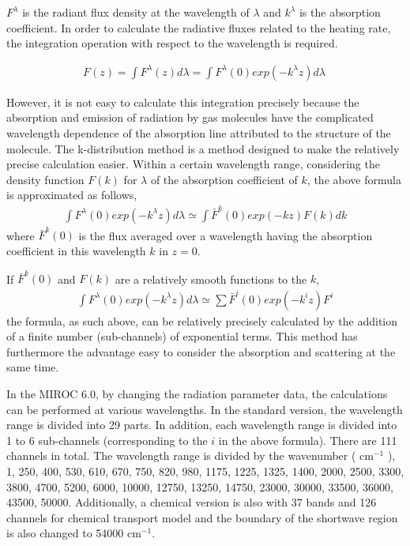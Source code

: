 \(F^{\lambda}\) is the radiant flux density at the wavelength of
\(\lambda\) and \(k^{\lambda}\) is the absorption coefficient. In order
to calculate the radiative fluxes related to the heating rate, the
integration operation with respect to the wavelength is required.

\begin{eqnarray}
  F(z) = \int F^\lambda(z) d \lambda= \int F^\lambda(0) exp (-k^\lambda z) d \lambda\
\end{eqnarray}

However, it is not easy to calculate this integration precisely because
the absorption and emission of radiation by gas molecules have the
complicated wavelength dependence of the absorption line attributed to
the structure of the molecule. The k-distribution method is a method
designed to make the relatively precise calculation easier. Within a
certain wavelength range, considering the density function \(F(k)\) for
\(\lambda\) of the absorption coefficient of \(k\), the above formula is
approximated as follows, \begin{eqnarray}
 \int F^\lambda(0) exp (-k^\lambda z) d \lambda
 \simeq \int \bar{F}^k(0) exp (-k z) F(k) dk
\end{eqnarray} where \(\bar{F}^k(0)\) is the flux averaged over a wavelength having
the absorption coefficient in this wavelength \(k\) in \(z=0\).

If \(\bar{F}^k(0)\) and \(F(k)\) are a relatively smooth functions to
the \(k\), \begin{eqnarray}
 \int F^\lambda(0) exp (-k^\lambda z) d \lambda
 \simeq \sum \bar{F}^i(0) exp (-k^i z) F^i
\end{eqnarray} the formula, as such above, can be relatively precisely calculated by
the addition of a finite number (sub-channels) of exponential terms.
This method has furthermore the advantage easy to consider the
absorption and scattering at the same time.

In the MIROC 6.0, by changing the radiation parameter data, the
calculations can be performed at various wavelengths. In the standard
version, the wavelength range is divided into 29 parts. In addition,
each wavelength range is divided into 1 to 6 sub-channels (corresponding
to the \(i\) in the above formula). There are 111 channels in total. The
wavelength range is divided by the wavenumber ( \(\mathrm{cm}^{-1}\) ),
1, 250, 400, 530, 610, 670, 750, 820, 980, 1175, 1225, 1325, 1400, 2000,
2500, 3300, 3800, 4700, 5200, 6000, 10000, 12750, 13250, 14750, 23000,
30000, 33500, 36000, 43500, 50000. Additionally, a chemical version is
also with 37 bands and 126 channels for chemical transport model and the
boundary of the shortwave region is also changed to 54000
\(\mathrm{cm}^{-1}\).

